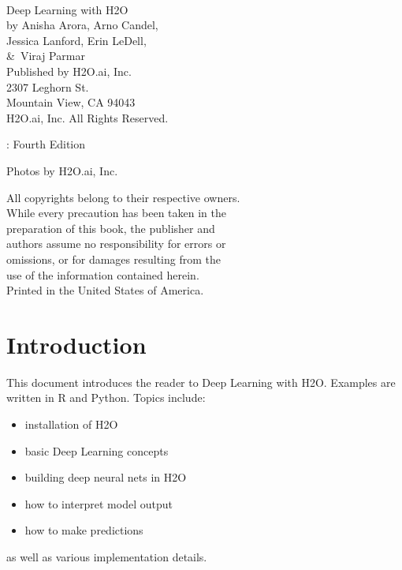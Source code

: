

\newpage
\restoregeometry

\null\vfill %

\thispagestyle{empty}%
{\raggedright\vfill\ 

Deep Learning with H2O\\

  by Anisha Arora, Arno Candel, \\
Jessica Lanford,  Erin LeDell, \\
\&\ Viraj Parmar \\
\bigskip
  Published by H2O.ai, Inc. \\
2307 Leghorn St. \\
Mountain View, CA 94043\\
\bigskip
{} H2O.ai, Inc. All Rights Reserved. 
\bigskip

\monthname \hspace{1pt}  \the\year: Fourth Edition
\bigskip

Photos by \textcopyright H2O.ai, Inc. 
\bigskip

All copyrights belong to their respective owners.\\
While every precaution has been taken in the\\
preparation of this book, the publisher and\\
authors assume no responsibility for errors or\\
omissions, or for damages resulting from the\\
use of the information contained herein.\\
\bigskip
Printed in the United States of America. 
}

\newpage
\thispagestyle{empty}%
\tableofcontents
\thispagestyle{empty}%


\newpage

\section{Introduction}
This document introduces the reader to Deep Learning with H2O.  Examples are written in R and Python.
Topics include: 
\begin{itemize}
\item installation of H2O
\item basic Deep Learning concepts
\item building deep neural nets in H2O
\item how to interpret model output
\item how to make predictions
\end{itemize}
as well as various implementation details.

